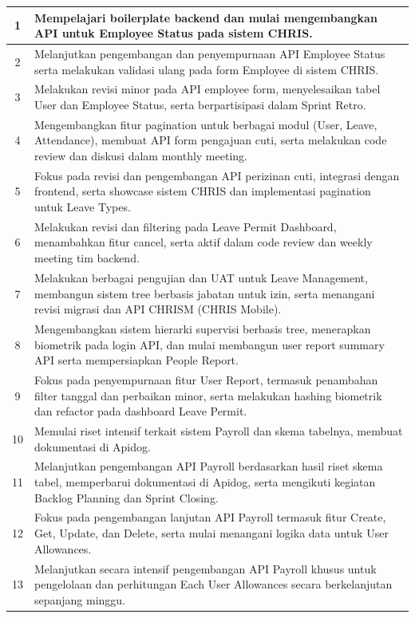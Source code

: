 \begin{center}
\begin{longtable}{|c|p{}|}
1 & Mempelajari boilerplate backend dan mulai mengembangkan API untuk Employee Status pada sistem CHRIS. \\
\hline
2 & Melanjutkan pengembangan dan penyempurnaan API Employee Status serta melakukan validasi ulang pada form Employee di sistem CHRIS. \\
\hline
3 & Melakukan revisi minor pada API employee form, menyelesaikan tabel User dan Employee Status, serta berpartisipasi dalam Sprint Retro. \\
\hline
4 & Mengembangkan fitur pagination untuk berbagai modul (User, Leave, Attendance), membuat API form pengajuan cuti, serta melakukan code review dan diskusi dalam monthly meeting. \\
\hline
5 & Fokus pada revisi dan pengembangan API perizinan cuti, integrasi dengan frontend, serta showcase sistem CHRIS dan implementasi pagination untuk Leave Types. \\
\hline
6 & Melakukan revisi dan filtering pada Leave Permit Dashboard, menambahkan fitur cancel, serta aktif dalam code review dan weekly meeting tim backend. \\
\hline
7 & Melakukan berbagai pengujian dan UAT untuk Leave Management, membangun sistem tree berbasis jabatan untuk izin, serta menangani revisi migrasi dan API CHRISM (CHRIS Mobile). \\
\hline
8 & Mengembangkan sistem hierarki supervisi berbasis tree, menerapkan biometrik pada login API, dan mulai membangun user report summary API serta mempersiapkan People Report. \\
\hline
9 & Fokus pada penyempurnaan fitur User Report, termasuk penambahan filter tanggal dan perbaikan minor, serta melakukan hashing biometrik dan refactor pada dashboard Leave Permit. \\
\hline
10 &  Memulai riset intensif terkait sistem Payroll dan skema tabelnya, membuat dokumentasi di Apidog.\\
\hline
11 &  Melanjutkan pengembangan API Payroll berdasarkan hasil riset skema tabel, memperbarui dokumentasi di Apidog, serta mengikuti kegiatan Backlog Planning dan Sprint Closing.\\
\hline
12 &  Fokus pada pengembangan lanjutan API Payroll termasuk fitur Create, Get, Update, dan Delete, serta mulai menangani logika data untuk User Allowances.\\
\hline
13 &  Melanjutkan secara intensif pengembangan API Payroll khusus untuk pengelolaan dan perhitungan Each User Allowances secara berkelanjutan sepanjang minggu.\\

\end{longtable}
\end{center}
